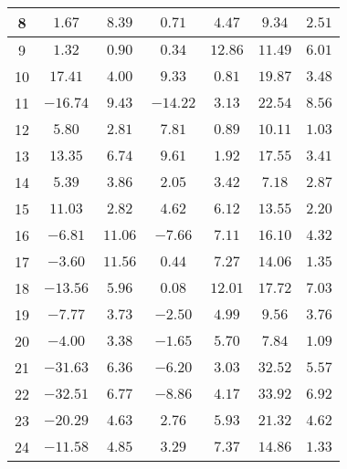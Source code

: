 \begin{table}[H]
\begin{tabular}{|c|c|c|c|c|c|c|}
                        8   &   $1.67$    &  $8.39$   &   $0.71$    &  $4.47$  &  $9.34$    &  $2.51$   \\ \hline
                        9   &   $1.32$    &  $0.90$   &   $0.34$    &  $12.86$ &  $11.49$   &  $6.01$   \\ \hline
                        10  &   $17.41$   &  $4.00$   &   $9.33$    &  $0.81$  &  $19.87$   &  $3.48$   \\ \hline
                        11  &   $-16.74$  &  $9.43$   &   $-14.22$  &  $3.13$  &  $22.54$   &  $8.56$   \\ \hline
                        12  &   $5.80$    &  $2.81$   &   $7.81$    &  $0.89$  &  $10.11$   &  $1.03$   \\ \hline
                        13  &   $13.35$   &  $6.74$   &   $9.61$    &  $1.92$  &  $17.55$   &  $3.41$   \\ \hline
                        14  &   $5.39$    &  $3.86$   &   $2.05$    &  $3.42$  &  $7.18$    &  $2.87$   \\ \hline
                        15  &   $11.03$   &  $2.82$   &   $4.62$    &  $6.12$  &  $13.55$   &  $2.20$   \\ \hline
                        16  &   $-6.81$   &  $11.06$  &   $-7.66$   &  $7.11$  &  $16.10$   &  $4.32$   \\ \hline
                        17  &   $-3.60$   &  $11.56$  &   $0.44$    &  $7.27$  &  $14.06$   &  $1.35$   \\ \hline
                        18  &   $-13.56$  &  $5.96$   &   $0.08$    &  $12.01$ &  $17.72$   &  $7.03$   \\ \hline
                        19  &   $-7.77$   &  $3.73$   &   $-2.50$   &  $4.99$  &  $9.56$    &  $3.76$   \\ \hline
                        20  &   $-4.00$   &  $3.38$   &   $-1.65$   &  $5.70$  &  $7.84$    &  $1.09$   \\ \hline
                        21  &   $-31.63$  &  $6.36$   &   $-6.20$   &  $3.03$  &  $32.52$   &  $5.57$   \\ \hline
                        22  &   $-32.51$  &  $6.77$   &   $-8.86$   &  $4.17$  &  $33.92$   &  $6.92$   \\ \hline
                        23  &   $-20.29$  &  $4.63$   &   $2.76$    &  $5.93$  &  $21.32$   &  $4.62$   \\ \hline
                        24  &   $-11.58$  &  $4.85$   &   $3.29$    &  $7.37$  &  $14.86$   &  $1.33$   \\ \hline

\end{tabular}
\end{table}
